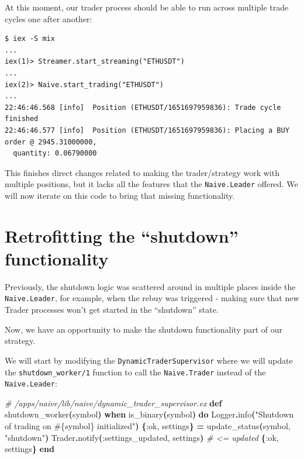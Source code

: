 \documentclass[
  oneside]{book}
\newenvironment{Shaded}{\begin{snugshade}}{\end{snugshade}}
\newcommand{\CommentTok}[1]{\textcolor[rgb]{0.56,0.35,0.01}{\textit{#1}}}
\newcommand{\ConstantTok}[1]{\textcolor[rgb]{0.56,0.35,0.01}{#1}}
\newcommand{\FunctionTok}[1]{\textcolor[rgb]{0.13,0.29,0.53}{\textbf{#1}}}
\newcommand{\KeywordTok}[1]{\textcolor[rgb]{0.13,0.29,0.53}{\textbf{#1}}}
\newcommand{\NormalTok}[1]{#1}
\newcommand{\OperatorTok}[1]{\textcolor[rgb]{0.81,0.36,0.00}{\textbf{#1}}}
\newcommand{\OtherTok}[1]{\textcolor[rgb]{0.56,0.35,0.01}{#1}}
\newcommand{\StringTok}[1]{\textcolor[rgb]{0.31,0.60,0.02}{#1}}
\newcommand{\VariableTok}[1]{\textcolor[rgb]{0.00,0.00,0.00}{#1}}
\begin{document}
At this moment, our trader process should be able to run across multiple trade cycles one after another:

\begin{verbatim}
$ iex -S mix
...
iex(1)> Streamer.start_streaming("ETHUSDT")
...
iex(2)> Naive.start_trading("ETHUSDT")
...
22:46:46.568 [info]  Position (ETHUSDT/1651697959836): Trade cycle finished
22:46:46.577 [info]  Position (ETHUSDT/1651697959836): Placing a BUY order @ 2945.31000000,
  quantity: 0.06790000
\end{verbatim}

This finishes direct changes related to making the trader/strategy work with multiple positions, but it lacks all the features that the \texttt{Naive.Leader} offered. We will now iterate on this code to bring that missing functionality.

\section{Retrofitting the ``shutdown'' functionality}\label{retrofitting-the-shutdown-functionality}

Previously, the shutdown logic was scattered around in multiple places inside the \texttt{Naive.Leader}, for example, when the rebuy was triggered - making sure that new Trader processes won't get started in the ``shutdown'' state.

Now, we have an opportunity to make the shutdown functionality part of our strategy.

We will start by modifying the \texttt{DynamicTraderSupervisor} where we will update the \texttt{shutdown\_worker/1} function to call the \texttt{Naive.Trader} instead of the \texttt{Naive.Leader}:

\begin{Shaded}
\begin{Highlighting}[]
  \CommentTok{\# /apps/naive/lib/naive/dynamic\_trader\_supervisor.ex}
  \KeywordTok{def}\NormalTok{ shutdown\_worker}\FunctionTok{(}\NormalTok{symbol}\FunctionTok{)} \KeywordTok{when}\NormalTok{ is\_binary}\FunctionTok{(}\NormalTok{symbol}\FunctionTok{)} \KeywordTok{do}
    \ConstantTok{Logger}\OperatorTok{.}\NormalTok{info}\FunctionTok{(}\StringTok{"Shutdown of trading on }\OtherTok{\#\{}\NormalTok{symbol}\OtherTok{\}}\StringTok{ initialized"}\FunctionTok{)}
    \FunctionTok{\{}\VariableTok{:ok}\NormalTok{, settings}\FunctionTok{\}} \OperatorTok{=}\NormalTok{ update\_status}\FunctionTok{(}\NormalTok{symbol, }\StringTok{"shutdown"}\FunctionTok{)}
    \ConstantTok{Trader}\OperatorTok{.}\NormalTok{notify}\FunctionTok{(}\VariableTok{:settings\_updated}\NormalTok{, settings}\FunctionTok{)} \CommentTok{\# \textless{}= updated}
    \FunctionTok{\{}\VariableTok{:ok}\NormalTok{, settings}\FunctionTok{\}}
  \KeywordTok{end}
\end{Highlighting}
\end{Shaded}
\end{document}
